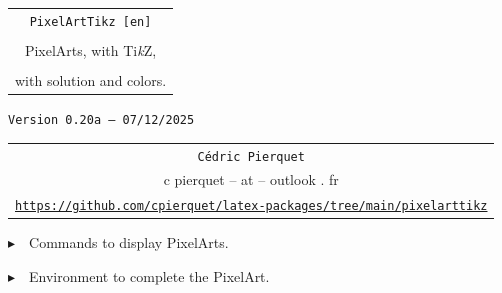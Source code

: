 \documentclass{article}
\def\TPversion{0.20a}
\def\TPdate{07/12/2025}
\begin{document}
\pagestyle{fancy}

\thispagestyle{empty}

\vspace{2cm}

\begin{center}
	\begin{minipage}{0.75\linewidth}
	\begin{tcolorbox}[colframe=yellow,colback=yellow!15]
		\begin{center}
			\begin{tabular}{c}
				{\Huge \texttt{PixelArtTikz [en]}}\\
				\\
				{\LARGE PixelArts, with Ti\textit{k}Z}, \\
				\\
				{\LARGE with solution and colors.} \\
			\end{tabular}
			
			\medskip
			
			{\small \texttt{Version \TPversion{} -- \TPdate}}
		\end{center}
	\end{tcolorbox}
\end{minipage}
\end{center}

\vspace{0.5cm}

\begin{center}
	\begin{tabular}{c}
	\texttt{Cédric Pierquet}\\
	{\ttfamily c pierquet -- at -- outlook . fr}\\
	\texttt{\url{https://github.com/cpierquet/latex-packages/tree/main/pixelarttikz}}
\end{tabular}
\end{center}

\vspace{0.25cm}

{$\blacktriangleright$~~Commands to display PixelArts.}

\smallskip

{$\blacktriangleright$~~Environment to complete the PixelArt.}

\smallskip

\vspace{1cm}
\end{document}
